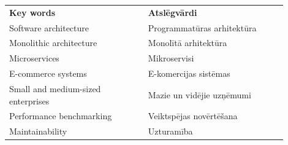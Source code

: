 \frontmatterpage
{}
\begin{tabular}{p{0.45\linewidth}p{0.45\linewidth}}
\textbf{Key words} & \textbf{Atslēgvārdi} \\
Software architecture & Programmatūras arhitektūra \\
Monolithic architecture & Monolītā arhitektūra \\
Microservices & Mikroservisi \\
E-commerce systems & E-komercijas sistēmas \\
Small and medium-sized enterprises & Mazie un vidējie uzņēmumi \\
Performance benchmarking & Veiktspējas novērtēšana \\
Maintainability & Uzturamība \\
\end{tabular}
\clearpage
